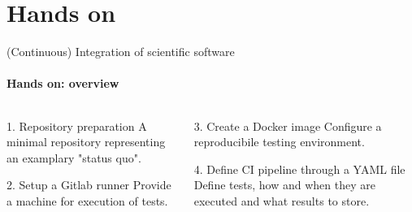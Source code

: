 \section{Hands on}

\begin{frame}{(Continuous) Integration of scientific software}
    \framesubtitle{Hands on: overview}
    \begin{columns}
    \begin{column}{0.48\textwidth}
        \begin{block}{1. Repository preparation}
            A minimal repository representing an examplary
            "status quo".
        \end{block}
        \begin{block}{2. Setup a Gitlab runner}
            Provide a machine for execution of tests.
        \end{block}
    \end{column}

    \begin{column}{0.48\textwidth}
        \begin{block}{3. Create a Docker image}
            Configure a reproducibile testing environment.
        \end{block}
        \begin{exampleblock}{4. Define CI pipeline through a YAML file}
            Define tests, how and when they are executed and what
            results to store.
        \end{exampleblock}
    \end{column}
    \end{columns}
\end{frame}

